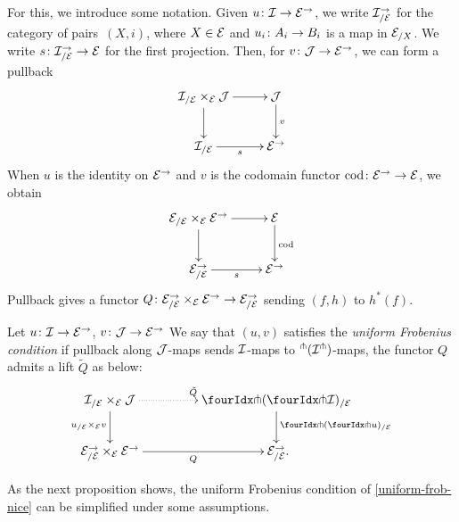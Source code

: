\documentclass[reqno,10pt,a4paper,oneside,draft]{amsart}
\begin{document}
{{For this, we  introduce some notation. Given $u \co \cal{I} \to \cal{E}^\to$, we write $\cal{I}_{/\cal{E}}^{\to}$ for the category of pairs~$(X, i)$,
where $X \in \cal{E}$ and $u_i \co A_i \to B_i$ is a map in $\cal{E}_{/X}$. We write $s \co \cal{I}_{/\cal{E}}^{\to} \to \cal{E}$ for the first projection. Then, for $v \co \cal{J} \to \cal{E}^\to$, we can form a pullback
\[
\xymatrix{
 \cal{I}_{/\cal{E}} \times_{\cal{E}} \cal{J} \ar[r] \ar[d] & 
 \cal{J} \ar[d]^v \\
  \cal{I}_{/\cal{E}} \ar[r]_s &
  \cal{E}^\to}
  \]
When $u$ is the identity on $\cal{E}^\to$ and $v$ is the codomain functor $\cod \co \cal{E}^\to \to \cal{E}$, we obtain
\[
\xymatrix{
 \cal{E}_{/\cal{E}} \times_{\cal{E}} \cal{E}^\to \ar[r] \ar[d] & 
 \cal{E} \ar[d]^{\cod} \\
  \cal{E}^\to_{/\cal{E}} \ar[r]_s &
  \cal{E}^\to}
  \]
Pullback gives a functor $Q \co  \cal{E}^\to_{/\cal{E}} \times_{\cal{E}} \cal{E}^\to \to \cal{E}_{/\cal{E}}^\to$
sending $(f, h)$ to $h^*(f)$. 



\begin{definition} \label{uniform-frob-nice} Let $u \co \cal{I} \to \cal{E}^\to$, $v \co \cal{J} \to \catE^\to$
We say that $(u, v)$  satisfies the \emph{uniform Frobenius condition} if
pullback along $\cal{J}$-maps sends $\cal{I}$-maps to ${}^\pitchfork(\cal{I}^\pitchfork)$-maps, \ie the functor $Q$ admits a lift $\tilde{Q}$ as below:
\begin{equation} \label{uniform-frob-nice:lift}
\begin{gathered}
\xymatrix@C+2em{
  \cal{I}_{/\cal{E}} \times_{\cal{E}} \cal{J}
  \ar@{.>}[r]^{\tilde{Q}}
  \ar[d]_{u_{/\cal{E}} \times_{\cal{E}} v}
&
  \liftl{(\liftr{\cal{I}})}_{/\cal{E}}
  \ar[d]^{\liftl{(\liftr{u})}_{/\cal{E}}}
\\
  \cal{E}^\to_{/\cal{E}} \times_{\cal{E}} \cal{E}^\to
  \ar[r]_{Q}
&
  \cal{E}_{/\cal{E}}^\to
\rlap{.}}
\end{gathered}
\end{equation}
\end{definition}

As the next proposition shows, the uniform Frobenius condition of \cref{uniform-frob-nice} can be simplified under some assumptions.

}}
\end{document}
